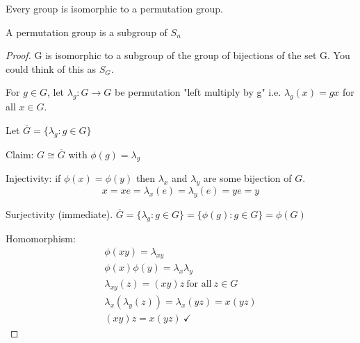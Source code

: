 \documentclass[class=scrartcl, crop=false]{standalone}
\begin{document}
\begin{theorem}
  Every group is isomorphic to a permutation group.
  \begin{recall}
    A permutation group is a subgroup of $S_n$
  \end{recall}
  \begin{proof}
    G is isomorphic to a subgroup of the group of bijections of the set G. You could think of this as $S_G$.

    For  $g \in G$, let $\lambda_g:G \to G$ be permutation "left multiply by g" 
    i.e. $\lambda_g(x) = gx$ for all $x \in G$.

    Let $\overline{G} = \{\lambda_g:g \in G\}$

    Claim:  $G \cong \overline{G}$ with $\phi(g) = \lambda_g$

    Injectivity: if $\phi(x) = \phi(y)$ then $\lambda_x$ and $\lambda_y$ are some bijection of $ G$.
    \[x = xe = \lambda_x(e) = \lambda_y(e) = ye = y\]

    Surjectivity (immediate). $\overline{G} = \{\lambda_g:g \in G\} = \{\phi(g):g \in G\} = \phi(G)$

    Homomorphism: 
    \begin{gather*}
      \phi(xy) = \lambda_{xy} \\
      \phi(x)\phi(y) = \lambda_x \lambda_y \\
      \lambda_{xy}(z) = (xy)z \ \text{for all} \ z \in G \\
      \lambda_x(\lambda_y(z)) = \lambda_x(yz) = x(yz) \\
      (xy)z = x(yz) \ \checkmark
    \end{gather*}
  \end{proof}
\end{theorem}
\end{document}
